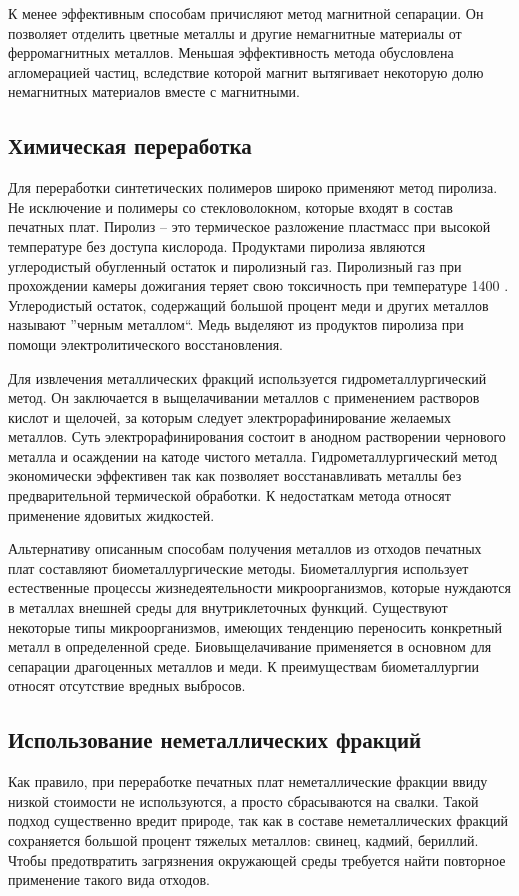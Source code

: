 \documentclass[14pt,oneside,final]{extreport}
\begin{document}
	К менее эффективным способам причисляют метод магнитной сепарации. Он позволяет отделить цветные металлы и другие немагнитные материалы от ферромагнитных металлов. Меньшая эффективность метода обусловлена агломерацией частиц, вследствие которой магнит вытягивает некоторую долю немагнитных материалов вместе с магнитными.   
	
	\subsection{Химическая переработка}
	Для переработки синтетических полимеров широко применяют метод пиролиза. Не исключение и полимеры со стекловолокном, которые входят в состав печатных плат. Пиролиз -- это термическое разложение пластмасс при высокой температуре без доступа кислорода. Продуктами пиролиза являются углеродистый обугленный остаток и пиролизный газ. Пиролизный газ при прохождении камеры дожигания теряет свою токсичность при температуре 1400  \textcelsius. Углеродистый остаток, содержащий  большой процент меди и других металлов называют ''черным металлом``. Медь выделяют из продуктов пиролиза при помощи электролитического восстановления.
	
	Для извлечения металлических фракций используется гидрометаллургический метод. Он заключается в выщелачивании металлов с применением растворов кислот и щелочей, за которым следует электрорафинирование желаемых металлов. Суть электрорафинирования состоит в анодном растворении чернового металла и осаждении на катоде чистого металла. Гидрометаллургический метод экономически эффективен так как позволяет восстанавливать металлы без предварительной термической обработки. К недостаткам метода относят применение ядовитых жидкостей. 
	
	Альтернативу описанным способам получения металлов из отходов печатных плат составляют биометаллургические методы. Биометаллургия использует естественные процессы жизнедеятельности микроорганизмов, которые нуждаются в металлах внешней среды для внутриклеточных функций. Существуют некоторые типы микроорганизмов, имеющих тенденцию переносить конкретный металл в определенной среде. Биовыщелачивание применяется в основном для сепарации драгоценных металлов и меди. К преимуществам биометаллургии относят отсутствие вредных выбросов. 
	
	\subsection{Использование неметаллических фракций}
	Как правило, при переработке печатных плат неметаллические фракции ввиду низкой стоимости не используются, а просто сбрасываются на свалки. Такой подход существенно вредит природе, так как в составе неметаллических фракций сохраняется большой процент тяжелых металлов: свинец, кадмий, бериллий. Чтобы предотвратить загрязнения окружающей среды требуется найти повторное применение такого вида отходов. 
	
\end{document}
